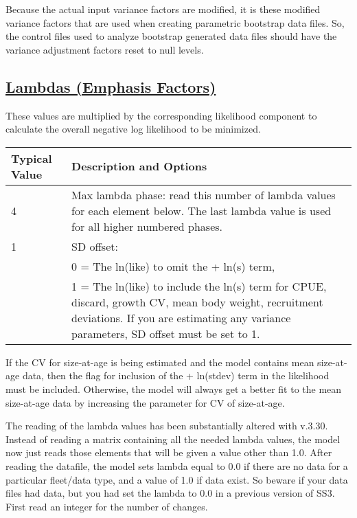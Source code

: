 Because the actual input variance factors are modified, it is these modified variance factors that are used when creating parametric bootstrap data files. So, the control files used to analyze bootstrap generated data files should have the variance adjustment factors reset to null levels.


\hypertarget{Lambdas}{}
\subsection[Lambdas (Emphasis Factors)]{\protect\hyperlink{Lambdas}{Lambdas (Emphasis Factors)}}
These values are multiplied by the corresponding likelihood component to calculate the overall negative log likelihood to be minimized.


\begin{tabular}{p{3cm} p{13cm}}
	\hline
	Typical Value & Description and Options \Tstrut\Bstrut\\
	\hline
	4 \Tstrut & Max lambda phase: read this number of lambda values for each element below. The last lambda value is used for all higher numbered phases. \Bstrut\\
	1 & SD offset: \\
	  & 0 = The ln(like) to omit the + ln(s) term, \\
	  & 1 = The ln(like) to include the ln(s) term for CPUE, discard, growth CV, mean body weight, recruitment deviations. If you are estimating any variance parameters, SD offset must be set to 1. \Bstrut\\
	\hline
\end{tabular}

\hypertarget{SaAlambda}{}
If the CV for size-at-age is being estimated and the model contains mean size-at-age data, then the flag for inclusion of the + ln(stdev) term in the likelihood must be included. Otherwise, the model will always get a better fit to the mean size-at-age data by increasing the parameter for CV of size-at-age.

The reading of the lambda values has been substantially altered with v.3.30. Instead of reading a matrix containing all the needed lambda values, the model now just reads those elements that will be given a value other than 1.0. After reading the datafile, the model sets lambda equal to 0.0 if there are no data for a particular fleet/data type, and a value of 1.0 if data exist. So beware if your data files had data, but you had set the lambda to 0.0 in a previous version of SS3. First read an integer for the number of changes.

